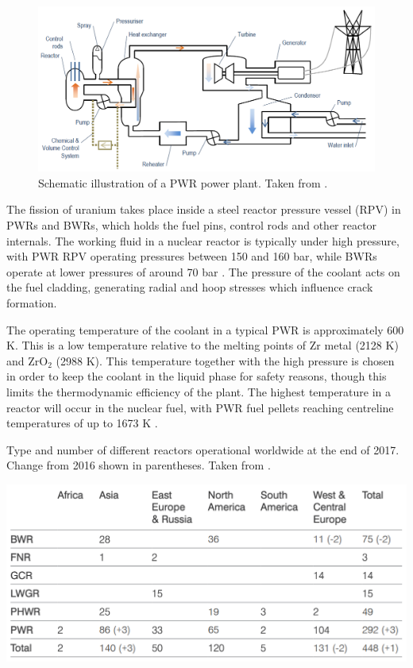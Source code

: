\begin{figure}[ht] %
\centering
\includegraphics[width=\linewidth]{images/pwrschematic.png}
\caption[Schematic illustration of a PWR power plant.]{Schematic illustration of a PWR power plant. Taken from \cite{lokhov2011technical}.}
\label{figure:pwrschematic}
\end{figure}

The fission of uranium takes place inside a steel reactor pressure vessel (RPV) in PWRs and BWRs, which holds the fuel pins, control rods and other reactor internals. The working fluid in a nuclear reactor is typically under high pressure, with PWR RPV operating pressures between 150 and 160 bar, while BWRs operate at lower pressures of around 70 bar \cite{kok2016nuclear, Server2010, Durmayaz2001}. The pressure of the coolant acts on the fuel cladding, generating radial and hoop stresses which influence crack formation. 

The operating temperature of the coolant in a typical PWR is approximately 600 K. This is a low temperature relative to the melting points of Zr metal (2128 K) and ZrO$_{2}$ (2988 K). This temperature together with the high pressure is chosen in order to keep the coolant in the liquid phase for safety reasons, though this limits the thermodynamic efficiency of the plant. The highest temperature in a reactor will occur in the nuclear fuel, with PWR fuel pellets reaching centreline temperatures of up to 1673 K \cite{beyer1998review}.

\begin{table}[ht] %
\centering
\caption[Type and number of different reactors operational worldwide at the end of 2017. Change from 2016 shown in parentheses.]{Type and number of different reactors operational worldwide at the end of 2017. Change from 2016 shown in parentheses. Taken from \cite{WNAreport2018}.}
\includegraphics[width=15cm]{images/WNA_report2018.png}
\label{figure:world_reactors}
\end{table}

